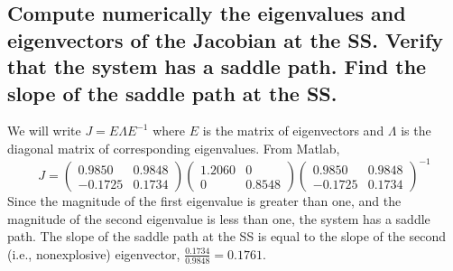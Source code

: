 \documentclass[11pt]{article} %
\begin{document}
\subsection{Compute numerically the eigenvalues and eigenvectors of the Jacobian at the SS. Verify that the system has a saddle path. Find the slope of the saddle path at the SS.}
We will write $J = E\Lambda E^{-1}$ where $E$ is the matrix of eigenvectors and $\Lambda$ is the diagonal matrix of corresponding eigenvalues. From Matlab,
\begin{equation*}
 J = \begin{pmatrix} 0.9850 & 0.9848 \\ -0.1725 & 0.1734 \end{pmatrix}  \begin{pmatrix} 1.2060 & 0 \\ 0 & 0.8548 \end{pmatrix}  \begin{pmatrix} 0.9850 & 0.9848 \\ -0.1725 & 0.1734 \end{pmatrix}^{-1}
\end{equation*}
Since the magnitude of the first eigenvalue is greater than one, and the magnitude of the second eigenvalue is less than one, the system has a saddle path. The slope of the saddle path at the SS is equal to the slope of the second (i.e., nonexplosive) eigenvector, $\frac{0.1734}{0.9848} = 0.1761.$
\end{document}
